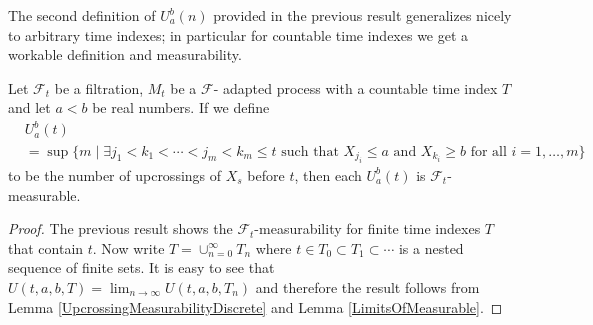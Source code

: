The second definition of $U_a^b(n)$ provided in the previous result
generalizes nicely to arbitrary time indexes; in particular for
countable time indexes we get a workable definition and measurability.
\begin{cor}\label{UpcrossingMeasurabilityCountable}Let $\mathcal{F}_t$ be a filtration, $M_t$ be a $\mathcal{F}$-
  adapted process with a countable time index $T$ and let $a<b$ be real numbers.  
If we define 
\begin{align*}
&U_a^b(t) \\
&= \sup \lbrace m \mid \exists  j_1 < k_1 < \dotsb < j_m <
k_m \leq t \text{ such that } X_{j_i} \leq a \text{ and } X_{k_i} \geq b
\text{ for all } i=1, \dotsc, m \rbrace
\end{align*}
to be the number of upcrossings of $X_s$ before $t$, then each $U_a^b(t)$
is $\mathcal{F}_t$-measurable.
\end{cor}
\begin{proof}
The previous result shows the $\mathcal{F}_t$-measurability for finite time indexes
$T$ that contain $t$.  Now write $T = \cup_{n=0}^\infty T_n$ where $t
\in T_0 \subset T_1 \subset \dotsb$ is a nested sequence of finite
sets.  It is easy to see that $U(t, a,b, T) = \lim_{n \to \infty} U(t,
a,b, T_n)$ and therefore the result follows from Lemma
\ref{UpcrossingMeasurabilityDiscrete} and Lemma \ref{LimitsOfMeasurable}.
\end{proof}

